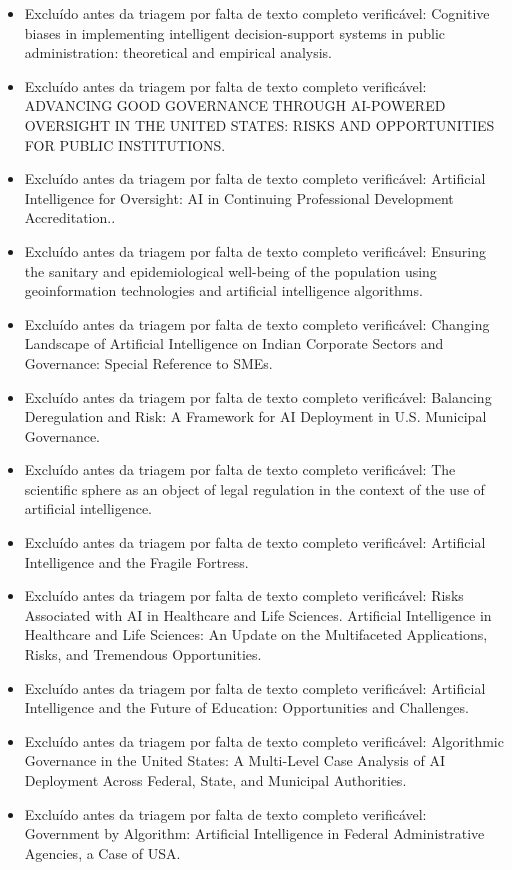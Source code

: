 \documentclass[12pt,a4paper]{article}
\begin{document}
\begin{itemize}
\item Excluído antes da triagem por falta de texto completo verificável: Cognitive biases in implementing intelligent decision-support systems in public administration: theoretical and empirical analysis.
\item Excluído antes da triagem por falta de texto completo verificável: ADVANCING GOOD GOVERNANCE THROUGH AI-POWERED OVERSIGHT IN THE UNITED STATES: RISKS AND OPPORTUNITIES FOR PUBLIC INSTITUTIONS.
\item Excluído antes da triagem por falta de texto completo verificável: Artificial Intelligence for Oversight: AI in Continuing Professional Development Accreditation..
\item Excluído antes da triagem por falta de texto completo verificável: Ensuring the sanitary and epidemiological well-being of the population using geoinformation technologies and artificial intelligence algorithms.
\item Excluído antes da triagem por falta de texto completo verificável: Changing Landscape of Artificial Intelligence on Indian Corporate Sectors and Governance: Special Reference to SMEs.
\item Excluído antes da triagem por falta de texto completo verificável: Balancing Deregulation and Risk: A Framework for AI Deployment in U.S. Municipal Governance.
\item Excluído antes da triagem por falta de texto completo verificável: The scientific sphere as an object of legal regulation in the context of the use of artificial intelligence.
\item Excluído antes da triagem por falta de texto completo verificável: Artificial Intelligence and the Fragile Fortress.
\item Excluído antes da triagem por falta de texto completo verificável: Risks Associated with AI in Healthcare and Life Sciences. Artificial Intelligence in Healthcare and Life Sciences: An Update on the Multifaceted Applications, Risks, and Tremendous Opportunities.
\item Excluído antes da triagem por falta de texto completo verificável: Artificial Intelligence and the Future of Education: Opportunities and Challenges.
\item Excluído antes da triagem por falta de texto completo verificável: Algorithmic Governance in the United States: A Multi-Level Case Analysis of AI Deployment Across Federal, State, and Municipal Authorities.
\item Excluído antes da triagem por falta de texto completo verificável: Government by Algorithm: Artificial Intelligence in Federal Administrative Agencies, a Case of USA.

\end{itemize}
\end{document}
